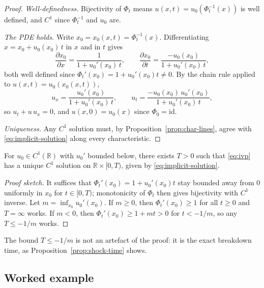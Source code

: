 \begin{proof}
\emph{Well-definedness.} Bijectivity of $\Phi_t$ means $u(x,t) =
u_0(\Phi_t^{-1}(x))$ is well defined, and $C^1$ since $\Phi_t^{-1}$ and
$u_0$ are.

\emph{The PDE holds.} Write $x_0 = x_0(x,t) = \Phi_t^{-1}(x)$.
Differentiating $x = x_0 + u_0(x_0)\, t$ in $x$ and in $t$ gives
\begin{equation}
  \frac{\partial x_0}{\partial x} = \frac{1}{1 + u_0'(x_0)\,t},
  \qquad
  \frac{\partial x_0}{\partial t} = \frac{-u_0(x_0)}{1 + u_0'(x_0)\, t},
\end{equation}
both well defined since $\Phi_t'(x_0) = 1+u_0'(x_0)t \neq 0$. By the chain
rule applied to $u(x,t) = u_0(x_0(x,t))$,
\begin{equation}
  u_x = \frac{u_0'(x_0)}{1 + u_0'(x_0)\,t},
  \qquad
  u_t = \frac{-u_0(x_0)\, u_0'(x_0)}{1 + u_0'(x_0)\, t},
\end{equation}
so $u_t + u\,u_x = 0$, and $u(x,0)=u_0(x)$ since $\Phi_0=\mathrm{id}$.

\emph{Uniqueness.} Any $C^1$ solution must, by
Proposition~\ref{prop:char-lines}, agree with \eqref{eq:implicit-solution}
along every characteristic.
\end{proof}

\begin{corollary}
\label{cor:local-existence}
For $u_0 \in C^1(\mathbb{R})$ with $u_0'$ bounded below, there exists
$T>0$ such that \eqref{eq:ivp} has a unique $C^1$ solution on $\mathbb{R}
\times [0,T)$, given by \eqref{eq:implicit-solution}.
\end{corollary}

\begin{proof}[Proof sketch]
It suffices that $\Phi_t'(x_0) = 1+u_0'(x_0)t$ stay bounded away from $0$
uniformly in $x_0$ for $t \in [0,T)$; monotonicity of $\Phi_t$ then gives
bijectivity with $C^1$ inverse. Let $m = \inf_{x_0} u_0'(x_0)$. If $m \geq
0$, then $\Phi_t'(x_0) \geq 1$ for all $t\geq0$ and $T=\infty$ works. If
$m<0$, then $\Phi_t'(x_0) \geq 1+mt > 0$ for $t < -1/m$, so any $T \leq
-1/m$ works.
\end{proof}

The bound $T \leq -1/m$ is not an artefact of the proof: it is the exact
breakdown time, as Proposition~\ref{prop:shock-time} shows.

\subsection{Worked example}
\label{subsec:char-example}

